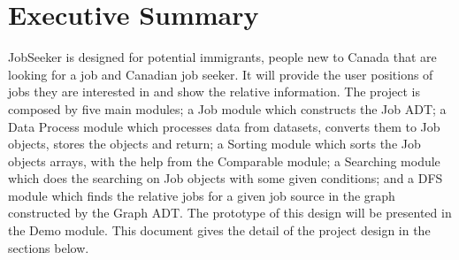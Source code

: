 \documentclass[12pt]{article}
\begin{document}
\newpage

\section*{Executive Summary}
JobSeeker is designed for potential immigrants, people new to Canada that are looking for a job and Canadian job seeker. It will provide the user positions of jobs they are interested in and show the relative information. The project is composed by five main modules; a Job module which constructs the Job ADT; a Data Process module which processes data from datasets, converts them to Job objects, stores the objects and return; a Sorting module which sorts the Job objects arrays, with the help from the Comparable module; a Searching module which does the searching on Job objects with some given conditions; and a DFS module which finds the relative jobs for a given job source in the graph constructed by the Graph ADT. The prototype of this design will be presented in the Demo module. This document gives the detail of the project design in the sections below.
\newpage
\tableofcontents
\newpage
\end{document}
